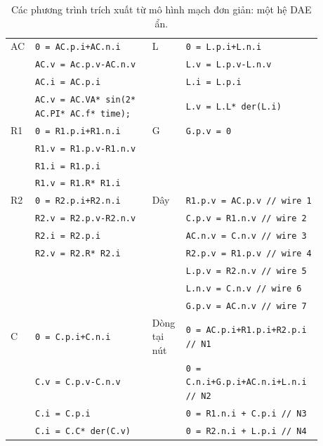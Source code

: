 \begin{table}[htbp]
\centering
\small
\begin{tabular}{|p{0.04\linewidth}|p{0.36\linewidth}|p{0.08\linewidth}|p{0.40\linewidth}|}
\hline
AC & \texttt{0 = AC.p.i+AC.n.i} & L & \texttt{0 = L.p.i+L.n.i}\\
 & \texttt{AC.v = Ac.p.v-AC.n.v} & & \texttt{L.v = L.p.v-L.n.v}\\
 & \texttt{AC.i = AC.p.i} & & \texttt{L.i = L.p.i}\\
 & \texttt{AC.v = AC.VA* sin(2* AC.PI* AC.f* time);} & & \texttt{L.v = L.L* der(L.i)}\\
\hline
R1 & \texttt{0 = R1.p.i+R1.n.i} & G & \texttt{G.p.v = 0}\\
 & \texttt{R1.v = R1.p.v-R1.n.v} & & \\
 & \texttt{R1.i = R1.p.i} & & \\
 & \texttt{R1.v = R1.R* R1.i} & & \\
\hline
R2 & \texttt{0 = R2.p.i+R2.n.i} & Dây & \texttt{R1.p.v = AC.p.v // wire 1}\\
 & \texttt{R2.v = R2.p.v-R2.n.v} & & \texttt{C.p.v = R1.n.v // wire 2}\\
 & \texttt{R2.i = R2.p.i} & & \texttt{AC.n.v = C.n.v // wire 3}\\
 & \texttt{R2.v = R2.R* R2.i} & & \texttt{R2.p.v = R1.p.v // wire 4}\\
 & & & \texttt{L.p.v = R2.n.v // wire 5}\\
 & & & \texttt{L.n.v = C.n.v // wire 6}\\
 & & & \texttt{G.p.v = AC.n.v // wire 7}\\
\hline
C & \texttt{0 = C.p.i+C.n.i} & Dòng tại nút & \texttt{0 = AC.p.i+R1.p.i+R2.p.i // N1}\\
 & \texttt{C.v = C.p.v-C.n.v} & & \texttt{0 = C.n.i+G.p.i+AC.n.i+L.n.i // N2}\\
 & \texttt{C.i = C.p.i} & & \texttt{0 = R1.n.i + C.p.i // N3}\\
 & \texttt{C.i = C.C* der(C.v)} & & \texttt{0 = R2.n.i + L.p.i // N4}\\
\hline
\end{tabular}
\caption{Các phương trình trích xuất từ mô hình mạch đơn giản: một hệ DAE ẩn.}
\end{table}

